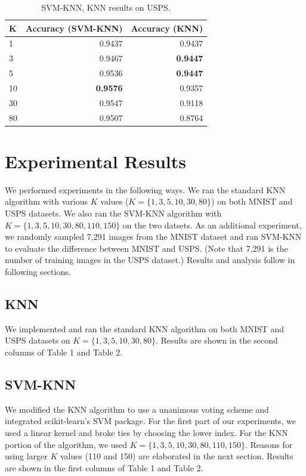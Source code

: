\documentclass[11pt,letterpaper]{article}
\begin{document}
\begin{table}
\begin{center}
\begin{tabular}{|l|r|r|}
\hline \bf K & \bf Accuracy (SVM-KNN) & \bf Accuracy (KNN)\\ \hline
1 & 0.9437 & 0.9437\\
3 & 0.9467 & \textbf{0.9447}\\
5 & 0.9536 & \textbf{0.9447}\\
10 & \textbf{0.9576} & 0.9357\\
30 & 0.9547 & 0.9118\\
80 & 0.9507 & 0.8764\\
\hline
\end{tabular}
\end{center}
\caption{\label{knn-mnist} SVM-KNN, KNN results on USPS. }
\end{table}

\section{Experimental Results}

We performed experiments in the following ways. We ran the standard KNN algorithm with various $K$ values ($K=\{1,3,5,10,30,80\}$) on both MNIST and USPS datasets. We also ran the SVM-KNN algorithm with $K=\{1,3,5,10,30,80,110,150\}$ on the two datsets. As an additional experiment, we randomly sampled 7,291 images from the MNIST dataset and ran SVM-KNN to evaluate the difference between MNIST and USPS. (Note that 7,291 is the number of training images in the USPS dataset.) Results and analysis follow in following sections.

\subsection{KNN}

We implemented and ran the standard KNN algorithm on both MNIST and USPS datasets on $K=\{1,3,5,10,30,80\}$. Results are shown in the second columns of Table 1 and Table 2.

\subsection{SVM-KNN}

We modified the KNN algorithm to use a unanimous voting scheme and integrated scikit-learn's SVM package. For the first part of our experiments, we used a linear kernel and broke ties by choosing the lower index. For the KNN portion of the algorithm, we used $K=\{1,3,5,10,30,80,110,150\}$. Reasons for using larger $K$ values (110 and 150) are elaborated in the next section. Results are shown in the first columns of Table 1 and Table 2.
\end{document}
